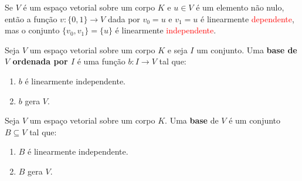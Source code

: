 \documentclass[11pt,twoside,a4paper]{book}
\begin{document}
\begin{exemplo}
Se $V$ é um espaço vetorial sobre um corpo $K$ e $u\in V$ é um elemento não nulo, então a função $v:\{0,1\}\rightarrow V$ dada por $v_0=u$ e $v_1=u$ é linearmente \textcolor{red}{dependente}, mas o conjunto $\{v_0,v_1\}=\{u\}$ é linearmente \textcolor{red}{independente}.
\end{exemplo}

\begin{definicao}\label{lideford}
Seja $V$ um espaço vetorial sobre um corpo $K$ e seja $I$ um conjunto. Uma \textbf{base de $V$ ordenada por $I$} é uma função $b:I\rightarrow V$ tal que:
\begin{enumerate}[label=(\roman*)]
\item $b$ é linearmente independente.
\item $b$ gera $V$.
\end{enumerate}
\end{definicao}

\begin{definicao}\label{lidef}
Seja $V$ um espaço vetorial sobre um corpo $K$. Uma \textbf{base} de $V$ é um conjunto $B\subseteq V$ tal que:
\begin{enumerate}[label=(\roman*)]
\item $B$ é linearmente independente.
\item $B$ gera $V$.
\end{enumerate}
\end{definicao}
\end{document}
